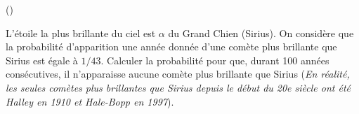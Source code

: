 \begin{exercice}\label{exo4-8} (\coolexo)

L'\'etoile la plus brillante du ciel est $\alpha$ du Grand Chien (Sirius). On consid\`ere que la probabilit\'e d'apparition une ann\'ee donn\'ee d'une com\`ete plus brillante que Sirius est \'egale \`a $1/43$. Calculer la probabilit\'e pour que, durant 100 ann\'ees cons\'ecutives, il n'apparaisse aucune com\`ete plus brillante que Sirius ({\it En r\'ealit\'e, les seules com\`etes plus brillantes que Sirius depuis le d\'ebut du 20e si\`ecle ont \'et\'e Halley en 1910 et Hale-Bopp en 1997}).\\

\end{exercice}
